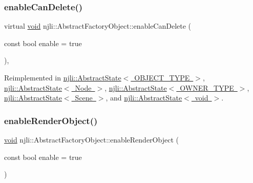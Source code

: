 \subsubsection{\texorpdfstring{enable\+Can\+Delete()}{enableCanDelete()}}
{\footnotesize\ttfamily virtual \mbox{\hyperlink{_thread_8h_af1e856da2e658414cb2456cb6f7ebc66}{void}} njli\+::\+Abstract\+Factory\+Object\+::enable\+Can\+Delete (\begin{DoxyParamCaption}\item[{const bool}]{enable = {\ttfamily true} }\end{DoxyParamCaption})\hspace{0.3cm}{\ttfamily [protected]}, {\ttfamily [virtual]}}



Reimplemented in \mbox{\hyperlink{classnjli_1_1_abstract_state_a4ed007508bd8f80af668a302376b7d1a}{njli\+::\+Abstract\+State$<$ O\+B\+J\+E\+C\+T\+\_\+\+T\+Y\+P\+E $>$}}, \mbox{\hyperlink{classnjli_1_1_abstract_state_a4ed007508bd8f80af668a302376b7d1a}{njli\+::\+Abstract\+State$<$ Node $>$}}, \mbox{\hyperlink{classnjli_1_1_abstract_state_a4ed007508bd8f80af668a302376b7d1a}{njli\+::\+Abstract\+State$<$ O\+W\+N\+E\+R\+\_\+\+T\+Y\+P\+E $>$}}, \mbox{\hyperlink{classnjli_1_1_abstract_state_a4ed007508bd8f80af668a302376b7d1a}{njli\+::\+Abstract\+State$<$ Scene $>$}}, and \mbox{\hyperlink{classnjli_1_1_abstract_state_a4ed007508bd8f80af668a302376b7d1a}{njli\+::\+Abstract\+State$<$ void $>$}}.

\mbox{\label{classnjli_1_1_abstract_factory_object_a87597409cecc91b4d40be5e9b3a2d4dc}} 
\subsubsection{\texorpdfstring{enable\+Render\+Object()}{enableRenderObject()}}
{\footnotesize\ttfamily \mbox{\hyperlink{_thread_8h_af1e856da2e658414cb2456cb6f7ebc66}{void}} njli\+::\+Abstract\+Factory\+Object\+::enable\+Render\+Object (\begin{DoxyParamCaption}\item[{const bool}]{enable = {\ttfamily true} }\end{DoxyParamCaption})\hspace{0.3cm}{\ttfamily [protected]}}

